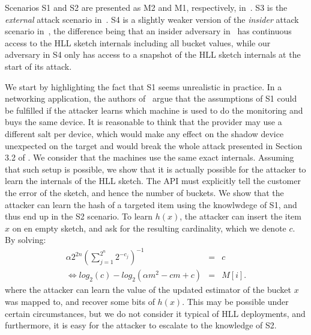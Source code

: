 \documentclass{IEEEtran}
\begin{document}
Scenarios S1 and S2 are presented as M2 and M1, respectively, in~\cite{hllvuln}. S3 is the \textit{external} attack scenario in~\cite{cardestprivacy}. S4 is a slightly weaker version of the \textit{insider} attack scenario in~\cite{cardestprivacy}, the difference being that an insider adversary in~\cite{cardestprivacy} has continuous access to the HLL sketch internals including all bucket values, while our adversary in S4 only has access to a snapshot of the HLL sketch internals at the start of its attack.

We start by highlighting the fact that S1 seems unrealistic in practice. In a networking application, the authors of~\cite{hllvuln} argue that the assumptions of S1 could be fulfilled if the attacker learns which machine is used to do the monitoring and buys the same device. It is reasonable to think that the provider may use a different salt per device, which would make any effect on the shadow device unexpected on the target and would break the whole attack presented in Section 3.2 of \cite{hllvuln}. We consider that the machines use the same exact internals. Assuming that such setup is possible, we show that it is actually possible for the attacker to learn the internals of the HLL sketch. The API must explicitly tell the customer the error of the sketch, and hence the number of buckets. We show that the attacker can learn the hash of a targeted item using the knowlwdege of S1, and thus end up in the S2 scenario. To learn $h(x)$, the attacker can insert the item $x$ on en empty sketch, and ask for the resulting cardinality, which we denote $c$. By solving:
\begin{eqnarray*}
    \alpha 2^{2n}(\sum_{j=1}^{2^n}2^{-c_j})^{-1}& = & c \\
    \Leftrightarrow log_2(c)-log_2(\alpha m^2 - cm + c) &=& M[i].
\end{eqnarray*}
where  the attacker can learn the value of the updated estimator of the bucket $x$ was mapped to, and recover some bits of $h(x)$. This may be possible under certain circumstances, but we do not consider it typical of HLL deployments, and furthermore, it is easy for the attacker to escalate to the knowledge of S2.
\end{document}
